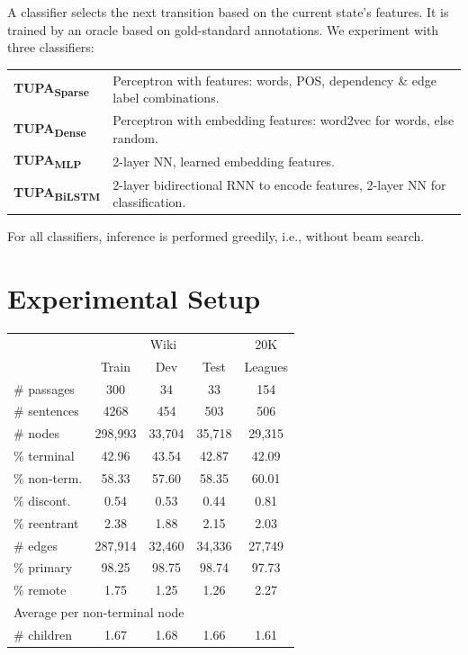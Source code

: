\documentclass[a0,portrait]{a0poster}
\newcommand{\parser}[1]{TUPA\textsubscript{#1}}
\begin{document}
\begin{multicols}{2}
\vspace{5mm}
A classifier selects the next transition based on the current state's features.
It is trained by an oracle based on gold-standard annotations.
We experiment with three classifiers:
\begin{flushleft}
	\begin{tabular}{ll}
	\textbf{\parser{Sparse}} & Perceptron with features: words, POS, dependency \& edge label combinations. \\
	\textbf{\parser{Dense}} & Perceptron with embedding features: word2vec \cite{mikolov2013efficient} for words, else random. \\
	\textbf{\parser{MLP}} & 2-layer NN, learned embedding features. \\
	\textbf{\parser{BiLSTM}} & 2-layer bidirectional RNN to encode features, 2-layer NN for classification. \\
	\end{tabular}
\end{flushleft}
\vspace{5mm}
For all classifiers, inference is performed greedily, i.e., without beam search.




\section*{Experimental Setup}

\begin{table}
	\vspace{-2cm}
	\begin{tabular}{l|ccc|c}
		& \multicolumn{3}{c|}{Wiki} & 20K \\
		& \small Train & \small Dev & \small Test & Leagues \\
		\hline
		\# passages & 300 & 34 & 33 & 154 \\
		\# sentences & 4268 & 454 & 503 & 506 \\
		\hline
		\# nodes & 298,993 & 33,704 & 35,718 & 29,315 \\
		\% terminal & 42.96 & 43.54 & 42.87 & 42.09 \\
		\% non-term. & 58.33 & 57.60 & 58.35 & 60.01 \\
		\% discont. & 0.54 & 0.53 & 0.44 & 0.81 \\
		\% reentrant & 2.38 & 1.88 & 2.15 & 2.03 \\
		\hline
		\# edges & 287,914 & 32,460 & 34,336 & 27,749 \\
		\% primary & 98.25 & 98.75 & 98.74 & 97.73 \\
		\% remote & 1.75 & 1.25 & 1.26 & 2.27 \\
		\hline
		\multicolumn{3}{l}{\footnotesize Average per non-terminal node} \\
		\# children & 1.67 & 1.68 & 1.66 & 1.61 
	\end{tabular}
\end{table}


\end{multicols}
\end{document}
